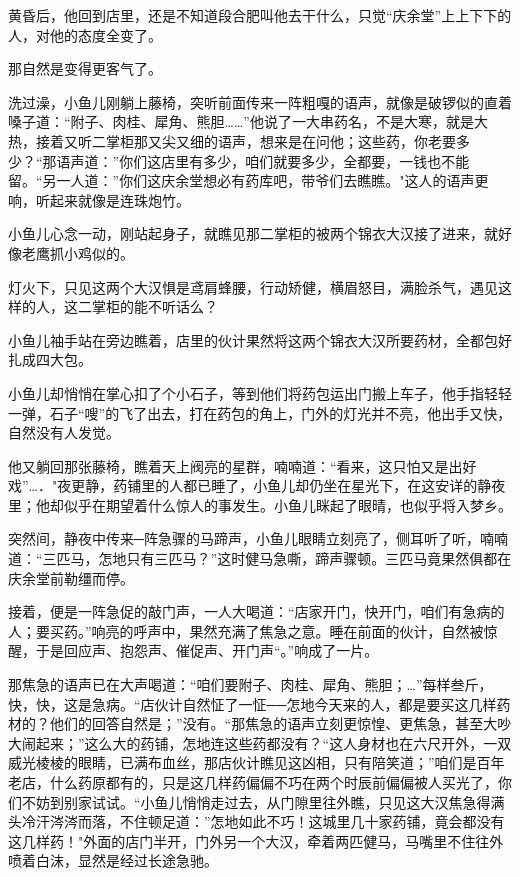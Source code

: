 \documentclass[12pt,oneside]{book}
\begin{document}
黄昏后，他回到店里，还是不知道段合肥叫他去干什么，只觉``庆余堂''上上下下的人，对他的态度全变了。

那自然是变得更客气了。

洗过澡，小鱼儿刚躺上藤椅，突听前面传来一阵粗嘎的语声，就像是破锣似的直着嗓子道：``附子、肉桂、犀角、熊胆\ldots\ldots{}''他说了一大串药名，不是大寒，就是大热，接着又听二掌柜那又尖又细的语声，想来是在问他；这些药，你老要多少？``那语声道：''你们这店里有多少，咱们就要多少，全都要，一钱也不能留。``另一人道：''你们这庆余堂想必有药库吧，带爷们去瞧瞧。"这人的语声更响，听起来就像是连珠炮竹。

小鱼儿心念一动，刚站起身子，就瞧见那二掌柜的被两个锦衣大汉接了进来，就好像老鹰抓小鸡似的。

灯火下，只见这两个大汉惧是鸢肩蜂腰，行动矫健，横眉怒目，满脸杀气，遇见这样的人，这二掌柜的能不听话么？

小鱼儿袖手站在旁边瞧着，店里的伙计果然将这两个锦衣大汉所要药材，全都包好扎成四大包。

小鱼儿却悄悄在掌心扣了个小石子，等到他们将药包运出门搬上车子，他手指轻轻一弹，石子``嗖''的飞了出去，打在药包的角上，门外的灯光并不亮，他出手又快，自然没有人发觉。

他又躺回那张藤椅，瞧着天上阀亮的星群，喃喃道：``看来，这只怕又是出好戏''\ldots．"夜更静，药铺里的人都已睡了，小鱼儿却仍坐在星光下，在这安详的静夜里；他却似乎在期望着什么惊人的事发生。小鱼儿眯起了眼晴，也似乎将入梦乡。

突然间，静夜中传来─阵急骤的马蹄声，小鱼儿眼睛立刻亮了，侧耳听了听，喃喃道：``三匹马，怎地只有三匹马？''这时健马急嘶，蹄声骤顿。三匹马竟果然俱都在庆余堂前勒缰而停。

接着，便是一阵急促的敲门声，一人大喝道：``店家开门，快开门，咱们有急病的人；要买药。''响亮的呼声中，果然充满了焦急之意。睡在前面的伙计，自然被惊醒，于是回应声、抱怨声、催促声、开门声``。''响成了一片。

那焦急的语声已在大声喝道：``咱们要附子、肉桂、犀角、熊胆；\ldots{}''每样叁斤，快，快，这是急病。``店伙计自然怔了一怔──怎地今天来的人，都是要买这几样药材的？他们的回答自然是；''没有。``那焦急的语声立刻更惊惶、更焦急，甚至大吵大闹起来；''这么大的药铺，怎地连这些药都没有？``这人身材也在六尺开外，一双威光棱棱的眼睛，已满布血丝，那店伙计瞧见这凶相，只有陪笑道；''咱们是百年老店，什么药原都有的，只是这几样药偏偏不巧在两个时辰前偏偏被人买光了，你们不妨到别家试试。``小鱼儿悄悄走过去，从门隙里往外瞧，只见这大汉焦急得满头冷汗涔涔而落，不住顿足道：''怎地如此不巧！这城里几十家药铺，竟会都没有这几样药！"外面的店门半开，门外另一个大汉，牵着两匹健马，马嘴里不住往外喷着白沫，显然是经过长途急驰。
\end{document}
